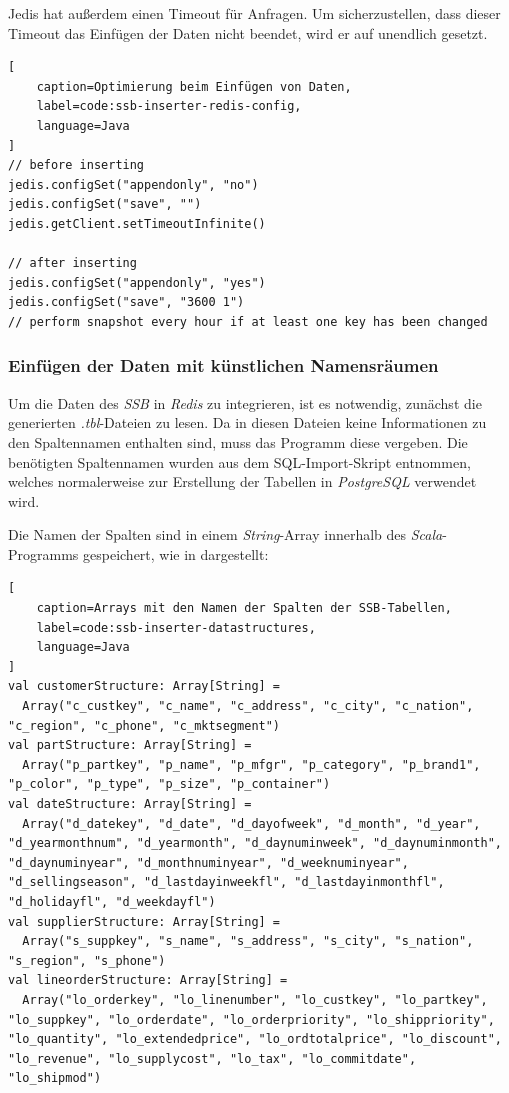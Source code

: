 Jedis hat außerdem einen Timeout für Anfragen. Um sicherzustellen, dass dieser Timeout das Einfügen der Daten nicht beendet, wird er auf unendlich gesetzt.

\begin{lstlisting}[
    caption=Optimierung beim Einfügen von Daten,
    label=code:ssb-inserter-redis-config,
    language=Java
]
// before inserting
jedis.configSet("appendonly", "no")
jedis.configSet("save", "")
jedis.getClient.setTimeoutInfinite()

// after inserting
jedis.configSet("appendonly", "yes")
jedis.configSet("save", "3600 1")
// perform snapshot every hour if at least one key has been changed
\end{lstlisting}


\subsubsection{Einfügen der Daten mit künstlichen Namensräumen}
Um die Daten des \emph{SSB} in \emph{Redis} zu integrieren, ist es notwendig, zunächst die generierten \emph{.tbl}-Dateien zu lesen. Da in diesen Dateien keine Informationen zu den Spaltennamen enthalten sind, muss das Programm diese vergeben. Die benötigten Spaltennamen wurden aus dem SQL-Import-Skript entnommen, welches normalerweise zur Erstellung der Tabellen in \emph{PostgreSQL} verwendet wird.

Die Namen der Spalten sind in einem \emph{String}-Array innerhalb des \emph{Scala}-Programms gespeichert, wie in  dargestellt:

\begin{lstlisting}[
    caption=Arrays mit den Namen der Spalten der SSB-Tabellen,
    label=code:ssb-inserter-datastructures,
    language=Java
]
val customerStructure: Array[String] =
  Array("c_custkey", "c_name", "c_address", "c_city", "c_nation", "c_region", "c_phone", "c_mktsegment")
val partStructure: Array[String] =
  Array("p_partkey", "p_name", "p_mfgr", "p_category", "p_brand1", "p_color", "p_type", "p_size", "p_container")
val dateStructure: Array[String] =
  Array("d_datekey", "d_date", "d_dayofweek", "d_month", "d_year", "d_yearmonthnum", "d_yearmonth", "d_daynuminweek", "d_daynuminmonth", "d_daynuminyear", "d_monthnuminyear", "d_weeknuminyear", "d_sellingseason", "d_lastdayinweekfl", "d_lastdayinmonthfl", "d_holidayfl", "d_weekdayfl")
val supplierStructure: Array[String] =
  Array("s_suppkey", "s_name", "s_address", "s_city", "s_nation", "s_region", "s_phone")
val lineorderStructure: Array[String] =
  Array("lo_orderkey", "lo_linenumber", "lo_custkey", "lo_partkey", "lo_suppkey", "lo_orderdate", "lo_orderpriority", "lo_shippriority", "lo_quantity", "lo_extendedprice", "lo_ordtotalprice", "lo_discount", "lo_revenue", "lo_supplycost", "lo_tax", "lo_commitdate", "lo_shipmod")

\end{lstlisting}


